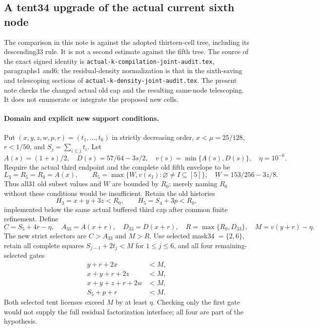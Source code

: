 \subsection{A tent34 upgrade of the actual current sixth node}
\label{sec:sixth-tent34-upgrade-analytic}

The comparison in this note is against the adopted thirteen-cell
tree, including its descending33 rule. It is not a second estimate
against the fifth tree. The source of the exact signed identity is
\texttt{actual-k-compilation-joint-audit.tex}, paragraphs1 and6;
the residual-density normalization is that in the sixth-saving and
telescoping sections of \texttt{actual-k-density-joint-audit.tex}.
The present note checks
the changed actual old cap and the resulting same-node telescoping.
It does not enumerate or integrate the proposed new cells.

\paragraph{Domain and explicit new support conditions.}
Put $(x,y,z,w,p,r)=(t_1,\ldots,t_6)$ in strictly decreasing order,
$x<\mu=25/128$, $r<1/50$, and $S_j=\sum_{i\le j}t_i$.
Let
\[
 A(s)=(1+s)/2,\quad D(s)=57/64-3s/2,\quad
 v(s)=\min\{A(s),D(s)\},\quad \eta=10^{-6}.
\]
Require the actual third endpoint and the complete old fifth
envelope to be
\[
 L_3=R_5=R_0=A(x),\qquad
 R_5=\max\{W,v(s_I):\varnothing\ne I\subseteq[5]\},
 \quad W=153/256-3z/8.
\]
Thus all31 old subset values and $W$ are bounded by $R_0$;
merely naming $R_0$ without these conditions would be insufficient.
Retain the old histories
\[
 H_3=x+y+3z<R_0,\qquad H_5=S_4+3p<R_0,
\]
implemented below the same actual buffered third cap after common
finite refinement. Define
\begin{equation}\label{eq:tent34-new-and-comparison-caps}
 C=S_5+4r-\eta,\quad A_{33}=A(x+r),\quad D_{33}=D(x+r),
 \quad R=\max\{R_0,D_{33}\},\quad M=v(y+r)-\eta.
\end{equation}
The new strict selectors are $C>A_{33}$ and $M>R$.
Use selected mask34 $=\{2,6\}$, retain all complete squares
$S_{j-1}+2t_j<M$ for $1\le j\le6$, and all four remaining-selected
gates
\begin{equation}\label{eq:tent34-selected-gates}
 \begin{split}
 y+r+2x&<M,\\
 x+y+r+2z&<M,\\
 x+y+z+r+2w&<M,\\
 S_5+p+r&<M.
 \end{split}
\end{equation}
Both selected tent licenses exceed $M$ by at least $\eta$.
Checking only the first gate would not supply the full residual
factorization interface; all four are part of the hypothesis.

